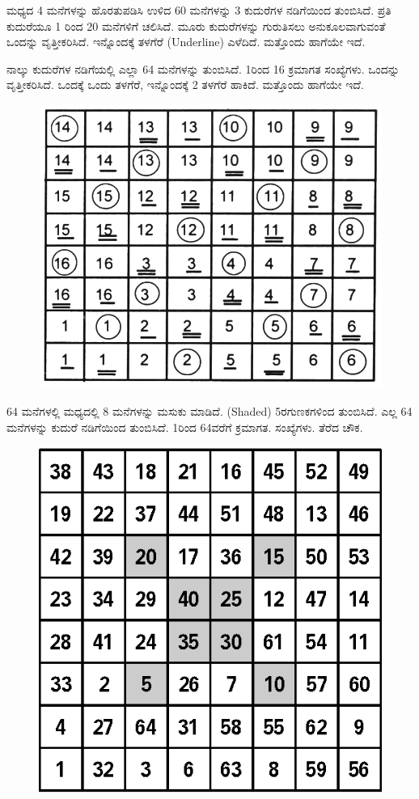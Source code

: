ಮಧ್ಯದ 4 ಮನೆಗಳನ್ನು ಹೊರತುಪಡಿಸಿ ಉಳಿದ 60 ಮನೆಗಳನ್ನು 3 ಕುದುರೆಗಳ ನಡಿಗೆಯಿಂದ ತುಂಬಿಸಿದೆ. ಪ್ರತಿ ಕುದುರೆಯೂ 1 ರಿಂದ 20 ಮನೆಗಳಿಗೆ ಚಲಿಸಿದೆ. ಮೂರು ಕುದುರೆ\-ಗಳನ್ನು ಗುರುತಿಸಲು ಅನುಕೂಲವಾಗುವಂತೆ ಒಂದನ್ನು ವೃತ್ತೀಕರಿಸಿದೆ. ಇನ್ನೊಂದಕ್ಕೆ ತಳಗೆರೆ (Underline) ಎಳೆದಿದೆ. ಮತ್ತೊಂದು ಹಾಗೆಯೇ ಇದೆ.

\eject

ನಾಲ್ಕು ಕುದುರೆಗಳ ನಡಿಗೆಯಲ್ಲಿ ಎಲ್ಲಾ 64 ಮನೆಗಳನ್ನು ತುಂಬಿಸಿದೆ. 1ರಿಂದ 16 ಕ್ರಮಾಗತ ಸಂಖ್ಯೆಗಳು. ಒಂದನ್ನು ವೃತ್ತೀಕರಿಸಿದೆ. ಒಂದಕ್ಕೆ ಒಂದು ತಳಗೆರೆ, ಇನ್ನೊಂದಕ್ಕೆ 2 ತಳಗೆರೆ ಹಾಕಿದೆ. ಮತ್ತೊಂದು ಹಾಗೆಯೇ ಇದೆ.
\begin{figure}[H]
\includegraphics{src/figures/chap6/fig6-19.jpg}
\end{figure}

64 ಮನೆಗಳಲ್ಲಿ ಮಧ್ಯದಲ್ಲಿ 8 ಮನೆಗಳನ್ನು ಮಸುಕು ಮಾಡಿದೆ. (Shaded) 5ರ\break ಗುಣಕಗಳಿಂದ ತುಂಬಿಸಿದೆ. ಎಲ್ಲ 64 ಮನೆಗಳನ್ನು ಕುದುರೆ ನಡಿಗೆಯಿಂದ ತುಂಬಿಸಿದೆ. 1ರಿಂದ 64ವರೆಗೆ ಕ್ರಮಾಗತ. ಸಂಖ್ಯೆಗಳು. ತೆರೆದ ಚೌಕ.
\begin{figure}[H]
\includegraphics{src/figures/chap6/fig6-20.eps}
\end{figure}

